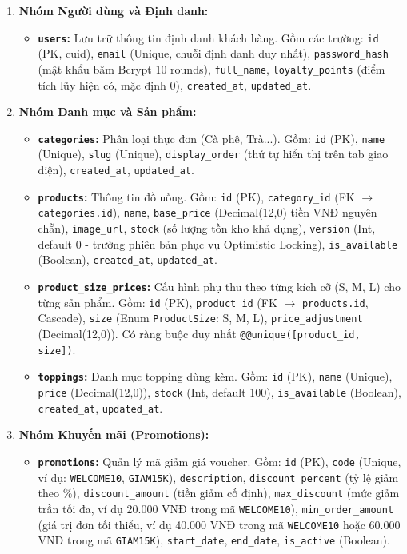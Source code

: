 \documentclass[12pt,a4paper,oneside]{report}
\begin{document}
\begin{enumerate}
    \item \textbf{Nhóm Người dùng và Định danh:}
    \begin{itemize}
        \item \textbf{\texttt{users}:} Lưu trữ thông tin định danh khách hàng. Gồm các trường: \texttt{id} (PK, cuid), \texttt{email} (Unique, chuỗi định danh duy nhất), \texttt{password\_hash} (mật khẩu băm Bcrypt 10 rounds), \texttt{full\_name}, \texttt{loyalty\_points} (điểm tích lũy hiện có, mặc định 0), \texttt{created\_at}, \texttt{updated\_at}.
    \end{itemize}

    \item \textbf{Nhóm Danh mục và Sản phẩm:}
    \begin{itemize}
        \item \textbf{\texttt{categories}:} Phân loại thực đơn (Cà phê, Trà...). Gồm: \texttt{id} (PK), \texttt{name} (Unique), \texttt{slug} (Unique), \texttt{display\_order} (thứ tự hiển thị trên tab giao diện), \texttt{created\_at}, \texttt{updated\_at}.
        \item \textbf{\texttt{products}:} Thông tin đồ uống. Gồm: \texttt{id} (PK), \texttt{category\_id} (FK \(\to\) \texttt{categories.id}), \texttt{name}, \texttt{base\_price} (Decimal(12,0) tiền VNĐ nguyên chẵn), \texttt{image\_url}, \texttt{stock} (số lượng tồn kho khả dụng), \texttt{version} (Int, default 0 - trường phiên bản phục vụ Optimistic Locking), \texttt{is\_available} (Boolean), \texttt{created\_at}, \texttt{updated\_at}.
        \item \textbf{\texttt{product\_size\_prices}:} Cấu hình phụ thu theo từng kích cỡ (S, M, L) cho từng sản phẩm. Gồm: \texttt{id} (PK), \texttt{product\_id} (FK \(\to\) \texttt{products.id}, Cascade), \texttt{size} (Enum \texttt{ProductSize}: S, M, L), \texttt{price\_adjustment} (Decimal(12,0)). Có ràng buộc duy nhất \texttt{@@unique([product\_id, size])}.
        \item \textbf{\texttt{toppings}:} Danh mục topping dùng kèm. Gồm: \texttt{id} (PK), \texttt{name} (Unique), \texttt{price} (Decimal(12,0)), \texttt{stock} (Int, default 100), \texttt{is\_available} (Boolean), \texttt{created\_at}, \texttt{updated\_at}.
    \end{itemize}

    \item \textbf{Nhóm Khuyến mãi (Promotions):}
    \begin{itemize}
        \item \textbf{\texttt{promotions}:} Quản lý mã giảm giá voucher. Gồm: \texttt{id} (PK), \texttt{code} (Unique, ví dụ: \texttt{WELCOME10}, \texttt{GIAM15K}), \texttt{description}, \texttt{discount\_percent} (tỷ lệ giảm theo \%), \texttt{discount\_amount} (tiền giảm cố định), \texttt{max\_discount} (mức giảm trần tối đa, ví dụ 20.000 VNĐ trong mã \texttt{WELCOME10}), \texttt{min\_order\_amount} (giá trị đơn tối thiểu, ví dụ 40.000 VNĐ trong mã \texttt{WELCOME10} hoặc 60.000 VNĐ trong mã \texttt{GIAM15K}), \texttt{start\_date}, \texttt{end\_date}, \texttt{is\_active} (Boolean).
    \end{itemize}


\end{enumerate}
\end{document}
